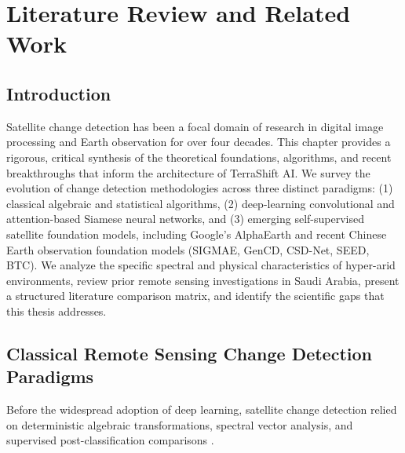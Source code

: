 \chapter{Literature Review and Related Work}
\label{ch:lit_review}

\section{Introduction}
\label{sec:lit_intro}
Satellite change detection has been a focal domain of research in digital image processing and Earth observation for over four decades. This chapter provides a rigorous, critical synthesis of the theoretical foundations, algorithms, and recent breakthroughs that inform the architecture of TerraShift AI. We survey the evolution of change detection methodologies across three distinct paradigms: (1) classical algebraic and statistical algorithms, (2) deep-learning convolutional and attention-based Siamese neural networks, and (3) emerging self-supervised satellite foundation models, including Google's AlphaEarth and recent Chinese Earth observation foundation models (SIGMAE, GenCD, CSD-Net, SEED, BTC). We analyze the specific spectral and physical characteristics of hyper-arid environments, review prior remote sensing investigations in Saudi Arabia, present a structured literature comparison matrix, and identify the scientific gaps that this thesis addresses.

\section{Classical Remote Sensing Change Detection Paradigms}
\label{sec:lit_classical}
Before the widespread adoption of deep learning, satellite change detection relied on deterministic algebraic transformations, spectral vector analysis, and supervised post-classification comparisons \citep{radke2005image, hussain2013change}.

